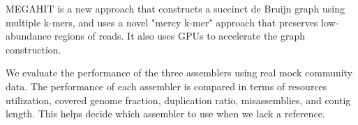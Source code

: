 \documentclass[10pt,a4paper,twocolumn]{article}
\begin{document}
MEGAHIT \cite{megahit} is a new approach that constructs a succinct de Bruijn graph using multiple k-mers, and uses a novel "mercy k-mer" approach that preserves low-abundance regions of reads. It also uses GPUs to accelerate the graph construction.

We evaluate the performance of the three assemblers using real mock community data. The performance of each assembler is compared in terms of  resources utilization, covered genome fraction, duplication ratio, misassemblies, and contig length. This helps decide which assembler to use when we lack a reference.  





 
\end{document}

